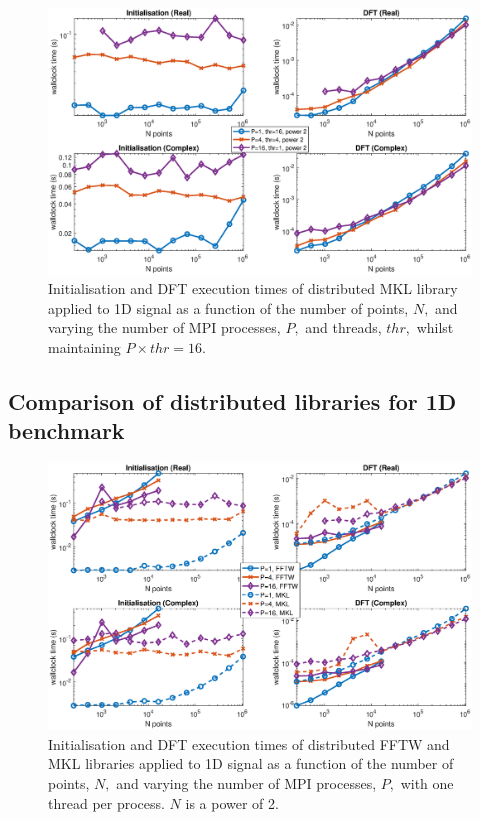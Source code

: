 \documentclass[a4paper]{article}
\begin{document}
\begin{figure}[htb]
    \centering
    \includegraphics[width=\linewidth]{../results/mkl_1d_mpi_thr.eps}
  \caption{Initialisation and DFT execution times of distributed MKL library applied to 1D signal as a function of the
    number of points, $N,$ and varying the number of MPI processes, $P,$ and threads, $thr,$ whilst maintaining $P\times thr=16.$}
  \label{1DDistMKL16}
\end{figure}

\subsection{Comparison of distributed libraries for 1D benchmark}\label{Sec:1DDistComp}


\begin{figure}[htb]
    \centering
    \includegraphics[width=\linewidth]{../results/fftw_mkl_2_1d_mpi.eps}
  \caption{Initialisation and DFT execution times of distributed FFTW and MKL libraries applied to 1D signal as a function of the
    number of points, $N,$ and varying the number of MPI processes, $P,$ with one thread per process. $N$ is a power of 2.}
  \label{1DDistFFTWMKL2}
\end{figure}
\end{document}
